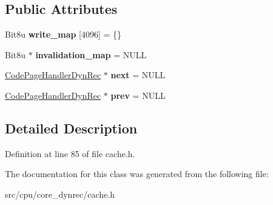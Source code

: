 \subsection*{Public Attributes}
\begin{DoxyCompactItemize}
\item 
\hypertarget{classCodePageHandlerDynRec_ac1d8018e02bcd95e91d5b606dba136af}{Bit8u {\bfseries write\-\_\-map} \mbox{[}4096\mbox{]} = \{\}}\label{classCodePageHandlerDynRec_ac1d8018e02bcd95e91d5b606dba136af}

\item 
\hypertarget{classCodePageHandlerDynRec_a47aab5bb1199222974e7206325511bcb}{Bit8u $\ast$ {\bfseries invalidation\-\_\-map} = N\-U\-L\-L}\label{classCodePageHandlerDynRec_a47aab5bb1199222974e7206325511bcb}

\item 
\hypertarget{classCodePageHandlerDynRec_a0d8b79c4e241f8f2527da02bd9d572ff}{\hyperlink{classCodePageHandlerDynRec}{Code\-Page\-Handler\-Dyn\-Rec} $\ast$ {\bfseries next} = N\-U\-L\-L}\label{classCodePageHandlerDynRec_a0d8b79c4e241f8f2527da02bd9d572ff}

\item 
\hypertarget{classCodePageHandlerDynRec_a1c92c142da75e5094c1707288923023f}{\hyperlink{classCodePageHandlerDynRec}{Code\-Page\-Handler\-Dyn\-Rec} $\ast$ {\bfseries prev} = N\-U\-L\-L}\label{classCodePageHandlerDynRec_a1c92c142da75e5094c1707288923023f}

\end{DoxyCompactItemize}


\subsection{Detailed Description}


Definition at line 85 of file cache.\-h.



The documentation for this class was generated from the following file\-:\begin{DoxyCompactItemize}
\item 
src/cpu/core\-\_\-dynrec/cache.\-h\end{DoxyCompactItemize}
